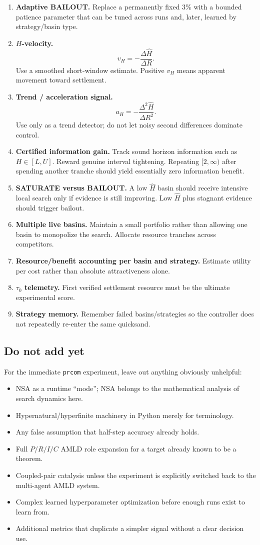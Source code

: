 \documentclass[11pt]{article}
\newcommand{\code}[1]{\texttt{#1}}
\begin{document}
\begin{enumerate}
\item \textbf{Adaptive BAILOUT.} Replace a permanently fixed 3\% with a bounded patience parameter that can be tuned across runs and, later, learned by strategy/basin type.
\item \textbf{$H$-velocity.}
\[
v_H=-\frac{\Delta\widehat H}{\Delta R}.
\]
Use a smoothed short-window estimate. Positive $v_H$ means apparent movement toward settlement.
\item \textbf{Trend / acceleration signal.}
\[
a_H=-\frac{\Delta^2\widehat H}{\Delta R^2}.
\]
Use only as a trend detector; do not let noisy second differences dominate control.
\item \textbf{Certified information gain.} Track sound horizon information such as $H\in[L,U]$. Reward genuine interval tightening. Repeating $[2,\infty)$ after spending another tranche should yield essentially zero information benefit.
\item \textbf{SATURATE versus BAILOUT.} A low $\widehat H$ basin should receive intensive local search only if evidence is still improving. Low $\widehat H$ plus stagnant evidence should trigger bailout.
\item \textbf{Multiple live basins.} Maintain a small portfolio rather than allowing one basin to monopolize the search. Allocate resource tranches across competitors.
\item \textbf{Resource/benefit accounting per basin and strategy.} Estimate utility per cost rather than absolute attractiveness alone.
\item \textbf{$\tau_0$ telemetry.} First verified settlement resource must be the ultimate experimental score.
\item \textbf{Strategy memory.} Remember failed basins/strategies so the controller does not repeatedly re-enter the same quicksand.
\end{enumerate}

\subsection{Do not add yet}

For the immediate \code{prcom} experiment, leave out anything obviously unhelpful:
\begin{itemize}
\item NSA as a runtime ``mode''; NSA belongs to the mathematical analysis of search dynamics here.
\item Hypernatural/hyperfinite machinery in Python merely for terminology.
\item Any false assumption that half-step accuracy already holds.
\item Full $P/R/I/C$ AMLD role expansion for a target already known to be a theorem.
\item Coupled-pair catalysis unless the experiment is explicitly switched back to the multi-agent AMLD system.
\item Complex learned hyperparameter optimization before enough runs exist to learn from.
\item Additional metrics that duplicate a simpler signal without a clear decision use.
\end{itemize}
\end{document}
